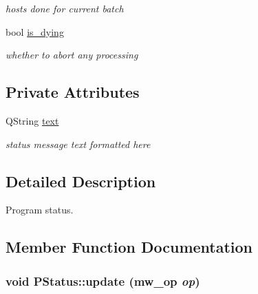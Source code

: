 \begin{CompactItemize}
\begin{CompactList}\small\item\em hosts done for current batch \item\end{CompactList}\item 
\hypertarget{classPStatus_3799b5b2e9b5a3979d74f12db68c168b}{
bool \hyperlink{classPStatus_3799b5b2e9b5a3979d74f12db68c168b}{is\_\-dying}}
\label{classPStatus_3799b5b2e9b5a3979d74f12db68c168b}

\begin{CompactList}\small\item\em whether to abort any processing \item\end{CompactList}\end{CompactItemize}
\subsection*{Private Attributes}
\begin{CompactItemize}
\item 
\hypertarget{classPStatus_56d3f6caa85a1a050cd41a099df6d931}{
QString \hyperlink{classPStatus_56d3f6caa85a1a050cd41a099df6d931}{text}}
\label{classPStatus_56d3f6caa85a1a050cd41a099df6d931}

\begin{CompactList}\small\item\em status message text formatted here \item\end{CompactList}\end{CompactItemize}


\subsection{Detailed Description}
Program status. 

\subsection{Member Function Documentation}
\hypertarget{classPStatus_633fc560875724006dbe656a7e4665e5}{
\subsubsection[update]{\setlength{\rightskip}{0pt plus 5cm}void PStatus::update ({\bf mw\_\-op} {\em op})}}
\label{classPStatus_633fc560875724006dbe656a7e4665e5}


